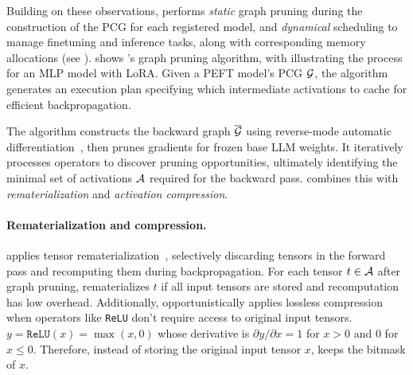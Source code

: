 Building on these observations, \sys performs {\em static} graph pruning during the construction of the PCG for each registered \peft model, and {\em dynamical} scheduling to manage finetuning and inference tasks, along with corresponding memory allocations (see ).
%
 shows \sys's graph pruning algorithm, with  illustrating the process for an MLP model with LoRA. Given a PEFT model's PCG $\mathcal{G}$, the algorithm generates an execution plan specifying which intermediate activations to cache for efficient backpropagation.

The algorithm constructs the backward graph $\overline{\mathcal{G}}$ using reverse-mode automatic differentiation~\cite{hogan2014fast}, then prunes gradients for frozen base LLM weights. It iteratively processes operators to discover pruning opportunities, ultimately identifying the minimal set of activations $\mathcal{A}$ required for the backward pass. \sys combines this with {\em rematerialization} and {\em activation compression}.
%

\paragraph{Rematerialization and compression.}
\sys applies tensor rematerialization~\cite{checkmate}, selectively discarding tensors in the forward pass and recomputing them during backpropagation. For each tensor $t \in \mathcal{A}$ after graph pruning, \sys rematerializes $t$ if all input tensors are stored and recomputation has low overhead. Additionally, \sys opportunistically applies lossless compression when operators like {\tt ReLU} don't require access to original input tensors. 
$y=\texttt{ReLU}(x) = \max{(x, 0)}$ whose derivative is $\partial y/\partial x = 1$ for $x>0$ and $0$ for $x\leq0$. Therefore, instead of storing the original input tensor $x$, \sys keeps the bitmask of $x$.
